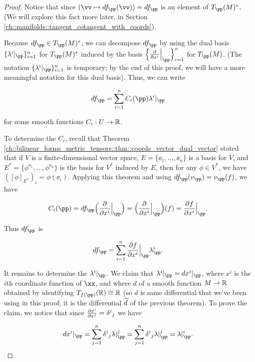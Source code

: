 \begin{proof}
    Notice that since $(\vv \mapsto df_\pp(\vv)) = df_\pp$ is an element of $T_\pp(M)^*$. (We will explore this fact more later, in Section \ref{ch::manifolds::tangent_cotangent_with_coords}).
    
    Because $df_\pp \in T_\pp(M)^*$, we can decompose $df_\pp$ by using the dual basis $\{\lambda^i|_\pp\}_{i = 1}^n$ for $T_\pp(M)^*$ induced by the basis $\Big\{ \frac{\pd}{\pd x^i}\Big|_\pp \Big\}_{i = 1}^n$ for $T_\pp(M)$. (The notation $\{\lambda^i|_\pp\}_{i = 1}^n$ is temporary; by the end of this proof, we will have a more meaningful notation for this dual basis). Thus, we can write
    
    \begin{align*}
        df_\pp = \sum_{i = 1}^n C_i(\pp) \lambda^i|_\pp
    \end{align*}
    
    for some smooth functions $C_i:U \rightarrow \mathbb{R}$. 
    
    To determine the $C_i$, recall that Theorem \ref{ch::bilinear_forms_metric_tensors::thm::coords_vector_dual_vector} stated that if $V$ is a finite-dimensional vector space, $E = \{\ee_1, ..., \ee_n\}$ is a basis for $V$, and $E^* = \{\phi^{\ee_1}, ..., \phi^{\ee_n}\}$ is the basis for $V^*$ induced by $E$, then for any $\phi \in V^*$, we have $([\phi]_{E^*})_i = \phi(\ee_i)$. Applying this theorem and using $df_\pp(v_\pp) = v_\pp(f)$, we have
    
    \begin{align*}
        C_i(\pp) = df_\pp\Big( \frac{\pd}{\pd x^i}\Big|_\pp \Big) = \Big( \frac{\pd}{\pd x^i}\Big|_\pp \Big) (f) = \frac{\pd f}{\pd x^i}\Big|_\pp.
    \end{align*}
    
    Thus $df_\pp$ is
    
    \begin{align*}
        df_\pp = \sum_{i = 1}^n \frac{\pd f}{\pd x^i}\Big|_\pp \lambda^i_\pp.
    \end{align*}
    
    It remains to determine the $\lambda^i|_\pp$. We claim that $\lambda^i|_\pp = dx^i|_\pp$, where $x^i$ is the $i$th coordinate function of $\xx$, and where $d$ of a smooth function $M \rightarrow \mathbb{R}$ obtained by identifying $T_{f(\pp)}(\R) \cong \R$ (so $d$ is same differential that we've been using in this proof; it is the differential $\widetilde{d}$ of the previous theorem). To prove the claim, we notice that since $\frac{\partial x^i}{\partial x^j} = \delta^i{}_j$ we have
    
    \begin{align*}
        dx^i|_\pp = \sum_{j = 1}^n \delta^i{}_j \lambda|_\pp^j = \sum_{j = 1}^n \delta^i{}_j \lambda|_\pp^j = \lambda|_\pp^i.
    \end{align*}
\end{proof}

